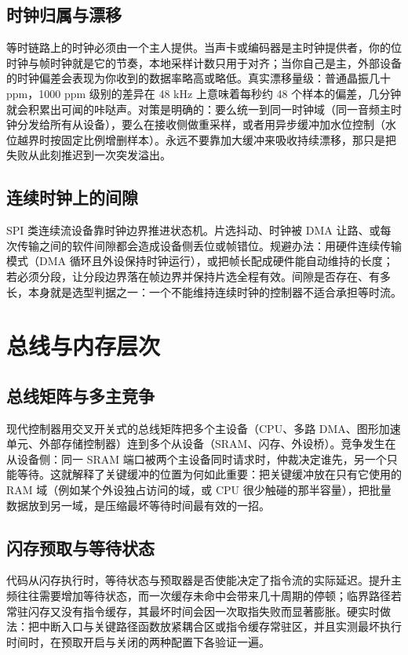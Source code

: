 \documentclass[12pt,a4paper,fontset=fandol]{ctexbook}
\begin{document}
\subsection{时钟归属与漂移}

等时链路上的时钟必须由一个主人提供。当声卡或编码器是主时钟提供者，你的位时钟与帧时钟就是它的节奏，本地采样计数只用于对齐；当你自己是主，外部设备的时钟偏差会表现为你收到的数据率略高或略低。真实漂移量级：普通晶振几十 ppm，1000 ppm 级别的差异在 48 kHz 上意味着每秒约 48 个样本的偏差，几分钟就会积累出可闻的咔哒声。对策是明确的：要么统一到同一时钟域（同一音频主时钟分发给所有从设备），要么在接收侧做重采样，或者用异步缓冲加水位控制（水位越界时按固定比例增删样本）。永远不要靠加大缓冲来吸收持续漂移，那只是把失败从此刻推迟到一次突发溢出。

\subsection{连续时钟上的间隙}

SPI 类连续流设备靠时钟边界推进状态机。片选抖动、时钟被 DMA 让路、或每次传输之间的软件间隙都会造成设备侧丢位或帧错位。规避办法：用硬件连续传输模式（DMA 循环且外设保持时钟运行），或把帧长配成硬件能自动维持的长度；若必须分段，让分段边界落在帧边界并保持片选全程有效。间隙是否存在、有多长，本身就是选型判据之一：一个不能维持连续时钟的控制器不适合承担等时流。

\section{总线与内存层次}

\subsection{总线矩阵与多主竞争}

现代控制器用交叉开关式的总线矩阵把多个主设备（CPU、多路 DMA、图形加速单元、外部存储控制器）连到多个从设备（SRAM、闪存、外设桥）。竞争发生在从设备侧：同一 SRAM 端口被两个主设备同时请求时，仲裁决定谁先，另一个只能等待。这就解释了关键缓冲的位置为何如此重要：把关键缓冲放在只有它使用的 RAM 域（例如某个外设独占访问的域，或 CPU 很少触碰的那半容量），把批量数据放到另一域，是压缩最坏等待时间最有效的一招。

\subsection{闪存预取与等待状态}

代码从闪存执行时，等待状态与预取器是否使能决定了指令流的实际延迟。提升主频往往需要增加等待状态，而一次缓存未命中会带来几十周期的停顿；临界路径若常驻闪存又没有指令缓存，其最坏时间会因一次取指失败而显著膨胀。硬实时做法：把中断入口与关键路径函数放紧耦合区或指令缓存常驻区，并且实测最坏执行时间时，在预取开启与关闭的两种配置下各验证一遍。
\end{document}
